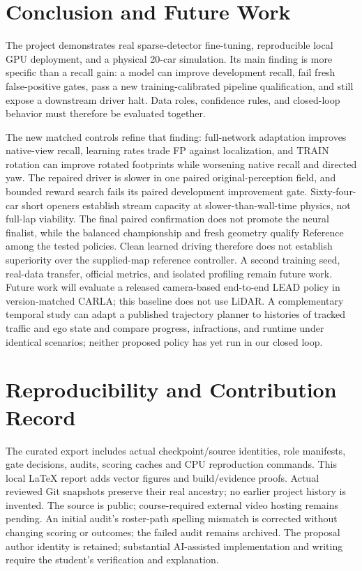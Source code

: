 \documentclass[conference]{IEEEtran}
\begin{document}
\section{Conclusion and Future Work}
The project demonstrates real sparse-detector fine-tuning, reproducible local GPU deployment, and a physical 20-car simulation. Its main finding is more specific than a recall gain: a model can improve development recall, fail fresh false-positive gates, pass a new training-calibrated pipeline qualification, and still expose a downstream driver halt. Data roles, confidence rules, and closed-loop behavior must therefore be evaluated together.

The new matched controls refine that finding: full-network adaptation improves native-view recall, learning rates trade FP against localization, and TRAIN rotation can improve rotated footprints while worsening native recall and directed yaw. The repaired driver is slower in one paired original-perception field, and bounded reward search fails its paired development improvement gate. Sixty-four-car short openers establish stream capacity at slower-than-wall-time physics, not full-lap viability. The final paired confirmation does not promote the neural finalist, while the balanced championship and fresh geometry qualify Reference among the tested policies. Clean learned driving therefore does not establish superiority over the supplied-map reference controller. A second training seed, real-data transfer, official metrics, and isolated profiling remain future work. Future work will evaluate a released camera-based end-to-end LEAD policy in version-matched CARLA; this baseline does not use LiDAR. A complementary temporal study can adapt a published trajectory planner to histories of tracked traffic and ego state and compare progress, infractions, and runtime under identical scenarios; neither proposed policy has yet run in our closed loop.

\section*{Reproducibility and Contribution Record}
The curated export includes actual checkpoint/source identities, role manifests, gate decisions, audits, scoring caches and CPU reproduction commands. This local LaTeX report adds vector figures and build/evidence proofs. Actual reviewed Git snapshots preserve their real ancestry; no earlier project history is invented. The source is public; course-required external video hosting remains pending. An initial audit's roster-path spelling mismatch is corrected without changing scoring or outcomes; the failed audit remains archived. The proposal author identity is retained; substantial AI-assisted implementation and writing require the student's verification and explanation.



\end{document}
